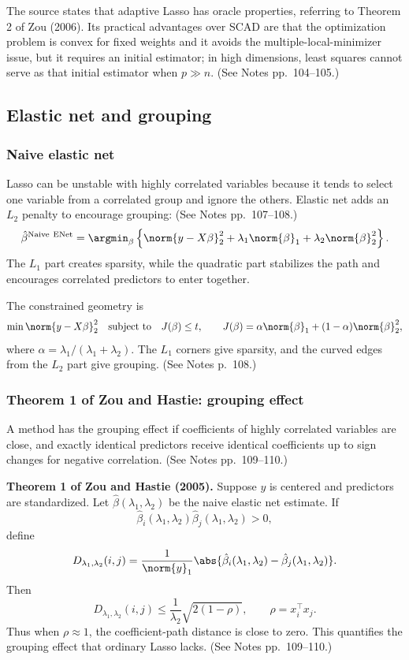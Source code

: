 The source states that adaptive Lasso has oracle properties, referring to Theorem 2 of Zou (2006). Its practical advantages over SCAD are that the optimization problem is convex for fixed weights and it avoids the multiple-local-minimizer issue, but it requires an initial estimator; in high dimensions, least squares cannot serve as that initial estimator when $p\gg n$. (See Notes pp.~104--105.)

\subsection{Elastic net and grouping}
\subsubsection{Naive elastic net}
Lasso can be unstable with highly correlated variables because it tends to select one variable from a correlated group and ignore the others. Elastic net adds an $L_2$ penalty to encourage grouping: (See Notes pp.~107--108.)
\[
\hat\beta^{\mathrm{Naive\ ENet}}
=\argmin_\beta
\left\{
\norm{y-X\beta}_2^2
+\lambda_1\norm{\beta}_1
+\lambda_2\norm{\beta}_2^2
\right\}.
\]
The $L_1$ part creates sparsity, while the quadratic part stabilizes the path and encourages correlated predictors to enter together.

The constrained geometry is
\[
\min\norm{y-X\beta}_2^2
\quad\text{subject to}\quad
J(\beta)\le t,
\qquad
J(\beta)=\alpha\norm{\beta}_1+(1-\alpha)\norm{\beta}_2^2,
\]
where $\alpha=\lambda_1/(\lambda_1+\lambda_2)$. The $L_1$ corners give sparsity, and the curved edges from the $L_2$ part give grouping. (See Notes p.~108.)

\subsubsection{Theorem 1 of Zou and Hastie: grouping effect}
A method has the grouping effect if coefficients of highly correlated variables are close, and exactly identical predictors receive identical coefficients up to sign changes for negative correlation. (See Notes pp.~109--110.)

\textbf{Theorem 1 of Zou and Hastie (2005).}
Suppose $y$ is centered and predictors are standardized. Let $\hat\beta(\lambda_1,\lambda_2)$ be the naive elastic net estimate. If
\[
\hat\beta_i(\lambda_1,\lambda_2)\hat\beta_j(\lambda_1,\lambda_2)>0,
\]
define
\[
D_{\lambda_1,\lambda_2}(i,j)
=
\frac{1}{\norm{y}_1}
\abs{\hat\beta_i(\lambda_1,\lambda_2)-\hat\beta_j(\lambda_1,\lambda_2)}.
\]
Then
\[
D_{\lambda_1,\lambda_2}(i,j)
\le
\frac{1}{\lambda_2}\sqrt{2(1-\rho)},
\qquad
\rho=x_i^\top x_j.
\]
Thus when $\rho\approx1$, the coefficient-path distance is close to zero. This quantifies the grouping effect that ordinary Lasso lacks. (See Notes pp.~109--110.)

